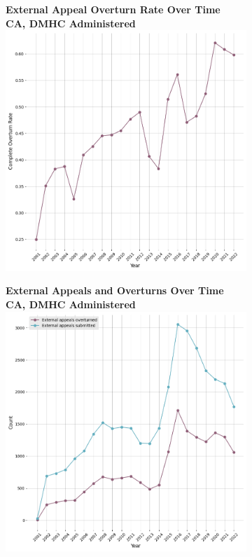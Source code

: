 \documentclass[12pt, a4paper,twoside,parskip=full]{report}
\theoremstyle{plain} %
\theoremstyle{definition} %
\theoremstyle{remark} %
\numberwithin{equation}{chapter}
\begin{document}
		
		\begin{figure}[h!]
			\centering
			\begin{subfigure}[b]{0.49\textwidth}
				\centering
				\textbf{External Appeal Overturn Rate Over Time}\\
				\textbf{CA, DMHC Administered}\\
				\includegraphics[width=\textwidth]{images/ca_dmhc_external_appeals/external_appeal_overturn_rates_by_year.png}
			\end{subfigure}
			\hfill
			\begin{subfigure}[b]{0.49\textwidth}
				\centering
				\textbf{External Appeals and Overturns Over Time}\\
				\textbf{CA, DMHC Administered}\\
				\includegraphics[width=\textwidth]{images/ca_dmhc_external_appeals/external_appeals_by_year.png}

\end{subfigure}
\end{figure}
\end{document}
